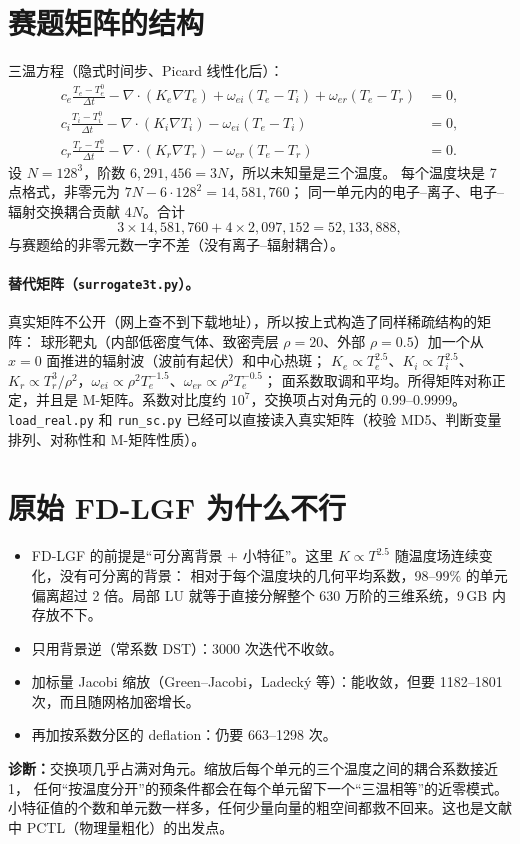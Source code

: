 \documentclass[11pt,a4paper]{ctexart}
\begin{document}
\section{赛题矩阵的结构}
三温方程（隐式时间步、Picard 线性化后）：
\begin{align*}
c_e\tfrac{T_e-T_e^0}{\Delta t}-\nabla\cdot(K_e\nabla T_e)+\omega_{ei}(T_e-T_i)+\omega_{er}(T_e-T_r)&=0,\\
c_i\tfrac{T_i-T_i^0}{\Delta t}-\nabla\cdot(K_i\nabla T_i)-\omega_{ei}(T_e-T_i)&=0,\\
c_r\tfrac{T_r-T_r^0}{\Delta t}-\nabla\cdot(K_r\nabla T_r)-\omega_{er}(T_e-T_r)&=0 .
\end{align*}
设 $N=128^3$，阶数 $6{,}291{,}456=3N$，所以未知量是三个温度。
每个温度块是 7 点格式，非零元为 $7N-6\cdot128^2=14{,}581{,}760$；
同一单元内的电子--离子、电子--辐射交换耦合贡献 $4N$。合计
\[
3\times14{,}581{,}760+4\times2{,}097{,}152=52{,}133{,}888,
\]
与赛题给的非零元数一字不差（没有离子--辐射耦合）。

\paragraph{替代矩阵（\texttt{surrogate3t.py}）。}真实矩阵不公开（网上查不到下载地址），所以按上式构造了同样稀疏结构的矩阵：
球形靶丸（内部低密度气体、致密壳层 $\rho=20$、外部 $\rho=0.5$）加一个从 $x=0$ 面推进的辐射波（波前有起伏）和中心热斑；
$K_e\propto T_e^{2.5}$、$K_i\propto T_i^{2.5}$、$K_r\propto T_r^3/\rho^2$，$\omega_{ei}\propto\rho^2T_e^{-1.5}$、$\omega_{er}\propto\rho^2T_e^{-0.5}$；
面系数取调和平均。所得矩阵对称正定，并且是 M-矩阵。系数对比度约 $10^7$，交换项占对角元的 0.99--0.9999。
\texttt{load\_real.py} 和 \texttt{run\_sc.py} 已经可以直接读入真实矩阵（校验 MD5、判断变量排列、对称性和 M-矩阵性质）。

\section{原始 FD-LGF 为什么不行}
\begin{itemize}
\item FD-LGF 的前提是“可分离背景 + 小特征”。这里 $K\propto T^{2.5}$ 随温度场连续变化，没有可分离的背景：
相对于每个温度块的几何平均系数，98--99\% 的单元偏离超过 2 倍。局部 LU 就等于直接分解整个 630 万阶的三维系统，9\,GB 内存放不下。
\item 只用背景逆（常系数 DST）：3000 次迭代不收敛。
\item 加标量 Jacobi 缩放（Green--Jacobi，Ladecký 等）：能收敛，但要 1182--1801 次，而且随网格加密增长。
\item 再加按系数分区的 deflation：仍要 663--1298 次。
\end{itemize}
\textbf{诊断：}交换项几乎占满对角元。缩放后每个单元的三个温度之间的耦合系数接近 1，
任何“按温度分开”的预条件都会在每个单元留下一个“三温相等”的近零模式。
小特征值的个数和单元数一样多，任何少量向量的粗空间都救不回来。这也是文献中 PCTL（物理量粗化）的出发点。
\end{document}
